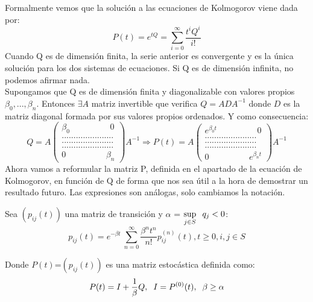 \documentclass[12pt,a4paper]{article}
\begin{document}
	Formalmente vemos que la solución a las ecuaciones de Kolmogorov viene dada por:
	\begin{equation*}
		P(t) = e^{t Q} = \sum_{i = 0}^{\infty}\frac{t^{i} Q^{i}}{i!}
	\end{equation*} 
	Cuando Q es de dimensión finita, la serie anterior es convergente y es la única solución para los dos sistemas de ecuaciones. Si Q es de dimensión infinita, no podemos afirmar nada.
	\\[0.2cm]
	Supongamos que Q es de dimensión finita y diagonalizable con valores propios $\beta_0 ,..., \beta_n$. Entonces $\exists A$ matriz invertible que verifica $Q = ADA^{-1}$ donde $D$ es la matriz diagonal formada por sus valores propios ordenados. Y como consecuencia:
	\begin{equation*}
		Q = A \begin{pmatrix}
			\beta_0 \hspace{2cm} 0 \\
			......................\\
			......................\\
			......................\\
			0 \hspace{2cm} \beta_n
		\end{pmatrix} A^{-1}
	\Rightarrow
		P(t) = A \begin{pmatrix}
			e^{\beta_0 t} \hspace{2cm} 0 \\
			......................\\
			......................\\
			......................\\
			0 \hspace{2cm} e^{\beta_n t}
		\end{pmatrix} A^{-1}
	\end{equation*}
	Ahora vamos a reformular la matriz P, definida en el apartado de la ecuación de Kolmogorov, en función de Q de forma que nos sea útil a la hora de demostrar un resultado futuro. Las expresiones son análogas, solo cambiamos la notación.
   \begin{theorem}
   	
   		Sea $(p_{ij}(t))$	una matriz de transición y $\alpha$ = $\sup\limits_{j\in S} \hspace{0.2cm} q_j <0$:
   		\begin{equation*}
   		p_{ij}(t)=e^{-\beta t}\ \sum_{n = 0}^{\infty}\frac{\beta^{n} t^{n}}{n!}p_{ij}^{(n)}(t), t \geq 0, i,j \in S
   		\end{equation*}
   		
   		Donde $P(t)$=$(p_{ij}(t))$ es una matriz estocástica definida como:
   		\begin{equation*}
   		P(t)=I+\frac{1}{\beta}Q, \hspace{0.2cm} I= P^{(0)}(t), \hspace{0.2cm} \beta \geq \alpha
   		\end{equation*}
   		
   \end{theorem}
         
\end{document}
